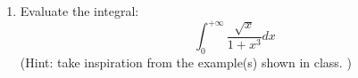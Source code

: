 \documentclass[fleqn]{article}
\begin{document}
\begin{enumerate}
\begin{enumerate}
{          When $R \to \infty$, then we have: \\
          \\
          \\
          $
            \bigints\limits_{0}^{+\infty} \dfrac{x^2}{1+x^4} dx=\dfrac{1}{2} \bigints\limits_{-\infty}^{+\infty} \dfrac{x^2}{1+x^4} dx
            \\
            \\
            \\
            \therefore ~~~~ \bigints\limits_{0}^{+\infty} \dfrac{x^2}{1+x^4} dx=\pi \dfrac{\sqrt{2}}{4}
            \\
            \\
          $
        }

    \end{enumerate}
    \item Evaluate the integral:
    $$\int^{+\infty}_{0} \frac{ \sqrt{x}}{1+x^3}dx$$
    (Hint: take inspiration from the example(s) shown in class. ) 
    
  \end{enumerate}
\end{document}
